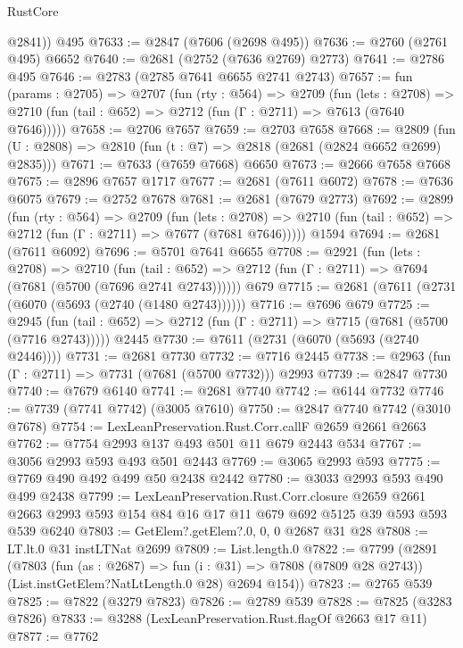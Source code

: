 \begin{lexlean}{RustCore}
\begin{coremodule}
        @2841))
    @495
@7633 := @2847 (@7606 (@2698 @495))
@7636 := @2760 (@2761 @495) @6652
@7640 := @2681 (@2752 (@7636 @2769) @2773)
@7641 := @2786 @495
@7646 := @2783 (@2785 @7641 @6655 @2741 @2743)
@7657 := fun (params : @2705) =>
  @2707
    (fun (rty : @564) =>
    @2709
      (fun (lets : @2708) =>
      @2710 (fun (tail : @652) => @2712 (fun (Γ : @2711) => @7613 (@7640 @7646)))))
@7658 := @2706 @7657
@7659 := @2703 @7658
@7668 := @2809 (fun (U : @2808) => @2810 (fun (t : @7) => @2818 (@2681 (@2824 @6652 @2699) @2835)))
@7671 := @7633 (@7659 @7668) @6650
@7673 := @2666 @7658 @7668
@7675 := @2896 @7657 @1717
@7677 := @2681 (@7611 @6072)
@7678 := @7636 @6075
@7679 := @2752 @7678
@7681 := @2681 (@7679 @2773)
@7692 := @2899
    (fun (rty : @564) =>
    @2709
      (fun (lets : @2708) =>
      @2710 (fun (tail : @652) => @2712 (fun (Γ : @2711) => @7677 (@7681 @7646)))))
    @1594
@7694 := @2681 (@7611 @6092)
@7696 := @5701 @7641 @6655
@7708 := @2921
    (fun (lets : @2708) =>
    @2710
      (fun (tail : @652) => @2712 (fun (Γ : @2711) => @7694 (@7681 (@5700 (@7696 @2741 @2743))))))
    @679
@7715 := @2681 (@7611 (@2731 (@6070 (@5693 (@2740 (@1480 @2743))))))
@7716 := @7696 @679
@7725 := @2945
    (fun (tail : @652) => @2712 (fun (Γ : @2711) => @7715 (@7681 (@5700 (@7716 @2743)))))
    @2445
@7730 := @7611 (@2731 (@6070 (@5693 (@2740 @2446))))
@7731 := @2681 @7730
@7732 := @7716 @2445
@7738 := @2963 (fun (Γ : @2711) => @7731 (@7681 (@5700 @7732))) @2993
@7739 := @2847 @7730
@7740 := @7679 @6140
@7741 := @2681 @7740
@7742 := @6144 @7732
@7746 := @7739 (@7741 @7742) (@3005 @7610)
@7750 := @2847 @7740 @7742 (@3010 @7678)
@7754 := LexLeanPreservation.Rust.Corr.callF @2659 @2661 @2663
@7762 := @7754 @2993 @137 @493 @501 @11 @679 @2443 @534
@7767 := @3056 @2993 @593 @493 @501 @2443
@7769 := @3065 @2993 @593
@7775 := @7769 @490 @492 @499 @50 @2438 @2442
@7780 := @3033 @2993 @593 @490 @499 @2438
@7799 := LexLeanPreservation.Rust.Corr.closure
    @2659
    @2661
    @2663
    @2993
    @593
    @154
    @84
    @16
    @17
    @11
    @679
    @692
    @5125
    @39
    @593
    @593
    @539
    @6240
@7803 := GetElem?.getElem?.{0, 0, 0} @2687 @31 @28
@7808 := LT.lt.{0} @31 instLTNat @2699
@7809 := List.length.{0}
@7822 := @7799
    (@2891
      (@7803
        (fun (as : @2687) => fun (i : @31) => @7808 (@7809 @28 @2743))
        (List.instGetElem?NatLtLength.{0} @28)
        @2694
        @154))
@7823 := @2765 @539
@7825 := @7822 (@3279 @7823)
@7826 := @2789 @539
@7828 := @7825 (@3283 @7826)
@7833 := @3288 (LexLeanPreservation.Rust.flagOf @2663 @17 @11)
@7877 := @7762

\end{coremodule}
\end{lexlean}
